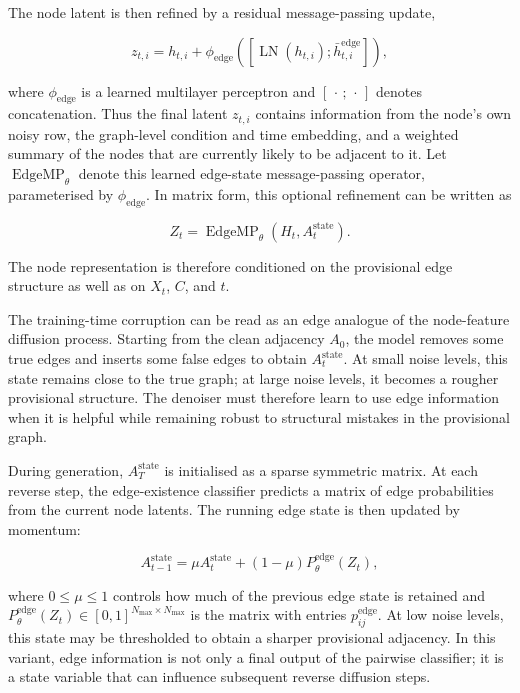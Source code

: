The node latent is then refined by a residual message-passing update,

\[
    z_{t,i}
    =
    h_{t,i}
    +
    \phi_{\mathrm{edge}}
    \left(
        \left[
        \operatorname{LN}(h_{t,i});
        \bar h^{\mathrm{edge}}_{t,i}
        \right]
    \right),
\]

where \(\phi_{\mathrm{edge}}\) is a learned multilayer perceptron and
\([\,\cdot\,;\,\cdot\,]\) denotes concatenation. Thus the final latent
\(z_{t,i}\) contains information from the node's own noisy row, the graph-level
condition and time embedding, and a weighted summary of the nodes that are
currently likely to be adjacent to it. Let
\(\operatorname{EdgeMP}_\theta\) denote this learned edge-state
message-passing operator, parameterised by \(\phi_{\mathrm{edge}}\). In matrix
form, this optional refinement can be written as

\[
    Z_t = \operatorname{EdgeMP}_\theta(H_t,A_t^{\mathrm{state}}).
\]

The node representation is therefore conditioned on the provisional edge
structure as well as on \(X_t\), \(C\), and \(t\).

The training-time corruption can be read as an edge analogue of the
node-feature diffusion process. Starting from the clean adjacency \(A_0\), the
model removes some true edges and inserts some false edges to obtain
\(A_t^{\mathrm{state}}\). At small noise levels, this state remains close to
the true graph; at large noise levels, it becomes a rougher provisional
structure. The denoiser must therefore learn to use edge information when it is
helpful while remaining robust to structural mistakes in the provisional graph.

During generation, \(A_T^{\mathrm{state}}\) is initialised as a sparse symmetric
matrix. At each reverse step, the edge-existence classifier predicts a matrix
of edge probabilities from the current node latents. The running edge state is
then updated by momentum:

\[
    A_{t-1}^{\mathrm{state}}
    =
    \mu A_t^{\mathrm{state}} +
    (1-\mu) P_\theta^{\mathrm{edge}}(Z_t),
\]

where \(0\leq\mu\leq1\) controls how much of the previous edge state is retained
and \(P_\theta^{\mathrm{edge}}(Z_t)\in[0,1]^{N_{\max}\times N_{\max}}\) is the
matrix with entries \(p^{\mathrm{edge}}_{ij}\). At low noise levels, this state
may be thresholded to obtain a sharper provisional adjacency. In this variant,
edge information is not only a final output of the pairwise classifier; it is a
state variable that can influence subsequent reverse diffusion steps.

